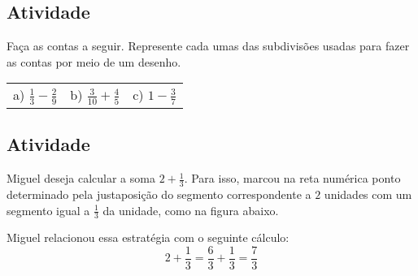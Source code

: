 \subsection{Atividade}

Faça as contas a seguir. Represente cada umas das subdivisões usadas para fazer as contas por meio de um desenho.

\begin{center}
  \begin{tabular}{m{}m{}m{}}    
     a) $\frac{1}{3} - \frac{2}{9}$  &   b) $\frac{3}{10} + \frac{4}{5}$  &   c) $1 - \frac{3}{7}$     
  \end{tabular}
\end{center}

\subsection{Atividade}
Miguel deseja calcular a soma $2 + \frac{1}{3}$. Para isso, marcou na reta numérica ponto determinado pela justaposição do segmento correspondente a $2$ unidades com um segmento igual a $\frac{1}{3}$ da unidade, como na figura abaixo. 

Miguel relacionou essa estratégia com o seguinte cálculo: 
$$ 2 + \frac{1}{3} =  \frac{6}{3} + \frac{1}{3} = \frac{7}{3}$$

% 


